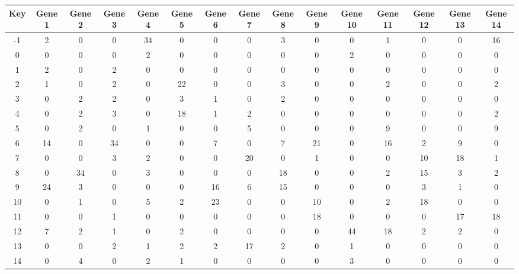 \begin{tabular}{|c|c|c|c|c|c|c|c|c|c|c|c|c|c|c|}
\hline
Key & Gene 1 & Gene 2 & Gene 3 & Gene 4 & Gene 5 & Gene 6 & Gene 7 & Gene 8 & Gene 9 & Gene 10 & Gene 11 & Gene 12 & Gene 13 & Gene 14 \\
\hline
-1 & 2 & 0 & 0 & 34 & 0 & 0 & 0 & 3 & 0 & 0 & 1 & 0 & 0 & 16 \\
0 & 0 & 0 & 0 & 2 & 0 & 0 & 0 & 0 & 0 & 2 & 0 & 0 & 0 & 0 \\
1 & 2 & 0 & 2 & 0 & 0 & 0 & 0 & 0 & 0 & 0 & 0 & 0 & 0 & 0 \\
2 & 1 & 0 & 2 & 0 & 22 & 0 & 0 & 3 & 0 & 0 & 2 & 0 & 0 & 2 \\
3 & 0 & 2 & 2 & 0 & 3 & 1 & 0 & 2 & 0 & 0 & 0 & 0 & 0 & 0 \\
4 & 0 & 2 & 3 & 0 & 18 & 1 & 2 & 0 & 0 & 0 & 0 & 0 & 0 & 2 \\
5 & 0 & 2 & 0 & 1 & 0 & 0 & 5 & 0 & 0 & 0 & 9 & 0 & 0 & 9 \\
6 & 14 & 0 & 34 & 0 & 0 & 7 & 0 & 7 & 21 & 0 & 16 & 2 & 9 & 0 \\
7 & 0 & 0 & 3 & 2 & 0 & 0 & 20 & 0 & 1 & 0 & 0 & 10 & 18 & 1 \\
8 & 0 & 34 & 0 & 3 & 0 & 0 & 0 & 18 & 0 & 0 & 2 & 15 & 3 & 2 \\
9 & 24 & 3 & 0 & 0 & 0 & 16 & 6 & 15 & 0 & 0 & 0 & 3 & 1 & 0 \\
10 & 0 & 1 & 0 & 5 & 2 & 23 & 0 & 0 & 10 & 0 & 2 & 18 & 0 & 0 \\
11 & 0 & 0 & 1 & 0 & 0 & 0 & 0 & 0 & 18 & 0 & 0 & 0 & 17 & 18 \\
12 & 7 & 2 & 1 & 0 & 2 & 0 & 0 & 0 & 0 & 44 & 18 & 2 & 2 & 0 \\
13 & 0 & 0 & 2 & 1 & 2 & 2 & 17 & 2 & 0 & 1 & 0 & 0 & 0 & 0 \\
14 & 0 & 4 & 0 & 2 & 1 & 0 & 0 & 0 & 0 & 3 & 0 & 0 & 0 & 0 \\
\hline
\end{tabular}